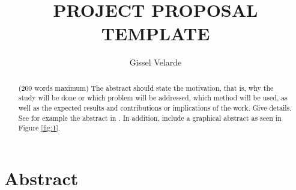 \documentclass[11pt,a4paper]{article}
\title{PROJECT PROPOSAL TEMPLATE}
\author{ Gissel Velarde }
\begin{document}
\maketitle	

 \tableofcontents
 \pagebreak
\begin{abstract}
({\color{blue}200 words maximum}) The abstract should state the motivation, that is, why the study will be done or which problem will be addressed, which method will be used, as well as the expected results and contributions or implications of the work. Give details. See for example the abstract in \cite{krizhevsky2017imagenet}. In addition, include a graphical abstract as seen in Figure \ref{fig:1}.
\end{abstract}


\section*{Abstract}
\end{document}
